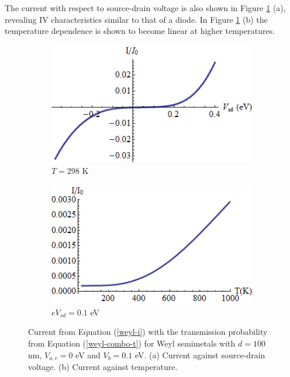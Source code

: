 		 The current with respect to source-drain voltage is also shown in Figure \ref{weyl-g-1} (a), revealing IV characteristics similar to that of a diode. In Figure \ref{weyl-g-1} (b) the temperature dependence is shown to become linear at higher temperatures.
		\begin{figure}[h]
			\begin{subfigure}[h]{0.5\textwidth}
				\centerline{\includegraphics[scale=0.55]{images/weyl-i-vsd}}
				\caption{$T=298$ K}
			\end{subfigure}
			\hspace{0.5cm}
			\begin{subfigure}[h]{0.5\textwidth}
				\centerline{\includegraphics[scale=0.55]{images/weyl-i-t}}
				\caption{$eV_{sd}=0.1$ eV}
			\end{subfigure}
			\caption{Current from Equation (\ref{weyl-i}) with the transmission probability from Equation (\ref{weyl-combo-t}) for Weyl semimetals with $d=100$ nm, $V_{a,c}=0$ eV and $V_{b}=0.1$ eV. (a) Current against source-drain voltage. (b) Current against temperature.}
			\label{weyl-g-1}
		\end{figure}
